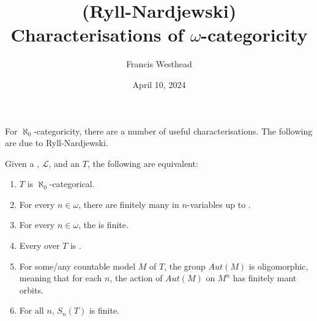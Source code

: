 \documentclass[a4paper]{article}
\title{(Ryll-Nardjewski) Characterisations of \(\omega\)-categoricity}
\date{April 10, 2024}
\author{Francis Westhead}
\begin{document}
\maketitle
\par{For \(\aleph _0\)-categoricity, there are a number of useful characterisations. The following are due to Ryll-Nardjewski.}\par{Given a , \(\mathcal {L}\), and an  \(T\), the following are equivalent:}\par{\begin{enumerate}
\item{\(T\) is \(\aleph _0\)-categorical.
    }
   \item{
        For every \(n \in   \omega\), there are finitely many  in \(n\)-variables up to .
   }
    \item{
        For every \(n \in   \omega\), the  is finite. 
    }
    \item{
        Every  over \(T\) is . 
    }
    \item{
        For some/any countable model \(M\) of \(T\), the  group \(Aut(M)\) is oligomorphic, meaning that for each \(n\), the action of \(Aut(M)\) on \(M^n\) has finitely mant orbits.
    }
    \item{
        For all \(n\), \(S_n(T)\) is finite.
    }
\end{enumerate}}
\printbibliography
\end{document}
